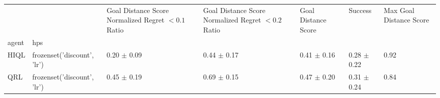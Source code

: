 \begin{tabular}{lllllll}
\toprule
 &  & Goal Distance Score Normalized Regret $< 0.1$ Ratio & Goal Distance Score Normalized Regret $< 0.2$ Ratio & Goal Distance Score & Success & Max Goal Distance Score \\
agent & hps &  &  &  &  &  \\
\midrule
HIQL & frozenset({'discount', 'lr'}) & 0.20 $\pm$ 0.09 & 0.44 $\pm$ 0.17 & 0.41 $\pm$ 0.16 & 0.28 $\pm$ 0.22 & 0.92 \\
\cline{1-7}
QRL & frozenset({'discount', 'lr'}) & 0.45 $\pm$ 0.19 & 0.69 $\pm$ 0.15 & 0.47 $\pm$ 0.20 & 0.31 $\pm$ 0.24 & 0.84 \\
\cline{1-7}
\bottomrule
\end{tabular}
